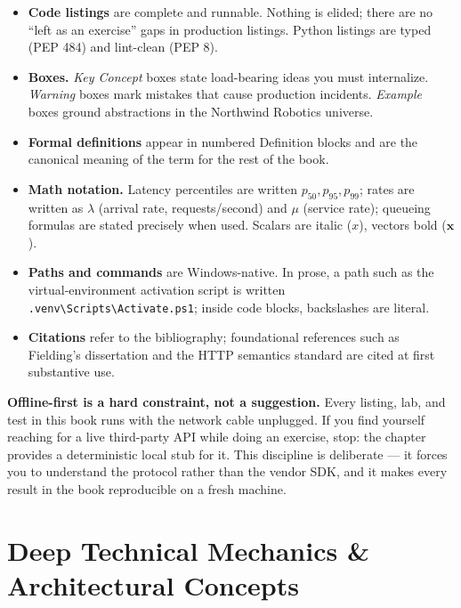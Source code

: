 \begin{itemize}
  \item \textbf{Code listings} are complete and runnable. Nothing is elided;
    there are no ``left as an exercise'' gaps in production listings.
    Python listings are typed (PEP 484) and lint-clean (PEP 8).
  \item \textbf{Boxes.} \emph{Key Concept} boxes state load-bearing ideas you
    must internalize. \emph{Warning} boxes mark mistakes that cause
    production incidents. \emph{Example} boxes ground abstractions in the
    Northwind Robotics universe.
  \item \textbf{Formal definitions} appear in numbered Definition blocks and
    are the canonical meaning of the term for the rest of the book.
  \item \textbf{Math notation.} Latency percentiles are written
    $p_{50}, p_{95}, p_{99}$; rates are written as $\lambda$ (arrival rate,
    requests/second) and $\mu$ (service rate); queueing formulas are stated
    precisely when used. Scalars are italic ($x$), vectors bold
    ($\mathbf{x}$).
  \item \textbf{Paths and commands} are Windows-native. In prose, a path such
    as the virtual-environment activation script is written
    \texttt{.venv\textbackslash Scripts\textbackslash Activate.ps1}; inside
    code blocks, backslashes are literal.
  \item \textbf{Citations} refer to the bibliography; foundational references
    such as Fielding's dissertation \cite{fielding2000rest} and the HTTP
    semantics standard \cite{rfc9110} are cited at first substantive use.
\end{itemize}

\begin{warningbox}
\textbf{Offline-first is a hard constraint, not a suggestion.} Every listing,
lab, and test in this book runs with the network cable unplugged. If you find
yourself reaching for a live third-party API while doing an exercise, stop:
the chapter provides a deterministic local stub for it. This discipline is
deliberate --- it forces you to understand the protocol rather than the
vendor SDK, and it makes every result in the book reproducible on a fresh
machine.
\end{warningbox}
\section{Deep Technical Mechanics \& Architectural Concepts}
\label{sec:ch0-mechanics}


